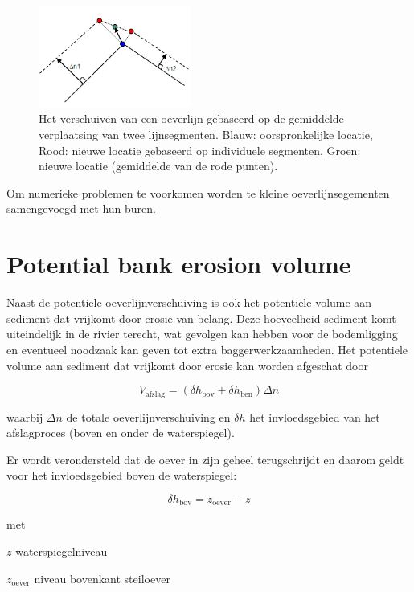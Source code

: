 \begin{figure}
\includegraphics[width=5cm]{figures/Fig4-4.png}
\caption{Het verschuiven van een oeverlijn gebaseerd op de gemiddelde verplaatsing van twee lijnsegmenten.
Blauw: oorspronkelijke locatie, Rood: nieuwe locatie gebaseerd op individuele segmenten, Groen: nieuwe locatie (gemiddelde van de rode punten).}
\label{Fig4.4}
\end{figure}

Om numerieke problemen te voorkomen worden te kleine oeverlijnsegementen samengevoegd met hun buren.

\section{Potential bank erosion volume} \label{Sec4.4}

Naast de potentiele oeverlijnverschuiving is ook het potentiele volume aan sediment dat vrijkomt door erosie van belang.
Deze hoeveelheid sediment komt uiteindelijk in de rivier terecht, wat gevolgen kan hebben voor de bodemligging en eventueel noodzaak kan geven tot extra baggerwerkzaamheden.
Het potentiele volume aan sediment dat vrijkomt door erosie kan worden afgeschat door

\begin{equation}
V_\text{afslag} = ( \delta h_\text{bov} + \delta h_\text{ben} ) \Delta n
\end{equation}

waarbij $\Delta n$ de totale oeverlijnverschuiving en $\delta h$ het invloedsgebied van het afslagproces (boven en onder de waterspiegel).

Er wordt verondersteld dat de oever in zijn geheel terugschrijdt en daarom geldt voor het invloedsgebied boven de waterspiegel:

\begin{equation}
\delta h_\text{bov} = z_\text{oever} - z
\end{equation}

met

\begin{symbollist}
\item[$z$] waterspiegelniveau 
\item[$z_\text{oever}$] niveau bovenkant steiloever 
\end{symbollist}


